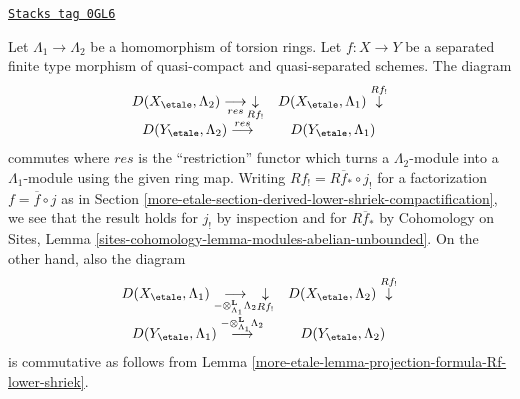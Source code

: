 \begin{remark}
\label{more-etale-remark-Rf-lower-shriek-change-of-rings}
\href{https://stacks.math.columbia.edu/tag/0GL6}{\texttt{Stacks tag 0GL6}}

Let $\Lambda_1 \to \Lambda_2$ be a homomorphism of torsion rings.
Let $f : X \to Y$ be a separated finite type morphism of quasi-compact
and quasi-separated schemes. The diagram
$$
\begin{array}{cc}D(X_\etale, \Lambda_2) \underset{res}{\longrightarrow}\underset{Rf_!}{\downarrow} & D(X_\etale, \Lambda_1) \overset{Rf_!}{\downarrow} \\ D(Y_\etale, \Lambda_2) \overset{res}{\longrightarrow} & D(Y_\etale, \Lambda_1)\end{array}
$$
commutes where $res$ is the ``restriction'' functor which turns a
$\Lambda_2$-module into a $\Lambda_1$-module using the given ring map.
Writing $Rf_! = R\overline{f}_* \circ j_!$ for a factorization
$f = \overline{f} \circ j$ as in
Section \ref{more-etale-section-derived-lower-shriek-compactification}, we see that
the result holds for $j_!$ by inspection and for $R\overline{f}_*$
by Cohomology on Sites, Lemma
\ref{sites-cohomology-lemma-modules-abelian-unbounded}.
On the other hand, also the diagram
$$
\begin{array}{cc}D(X_\etale, \Lambda_1)
\underset{- \otimes_{\Lambda_1}^\mathbf{L} \Lambda_2}{\longrightarrow}\underset{Rf_!}{\downarrow} & D(X_\etale, \Lambda_2) \overset{Rf_!}{\downarrow} \\ D(Y_\etale, \Lambda_1)
\overset{- \otimes_{\Lambda_1}^\mathbf{L} \Lambda_2}{\longrightarrow} & D(Y_\etale, \Lambda_2)\end{array}
$$
is commutative as follows from
Lemma \ref{more-etale-lemma-projection-formula-Rf-lower-shriek}.
\end{remark}

